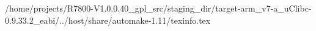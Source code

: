 /home/projects/R7800-V1.0.0.40_gpl_src/staging_dir/target-arm_v7-a_uClibc-0.9.33.2_eabi/../host/share/automake-1.11/texinfo.tex